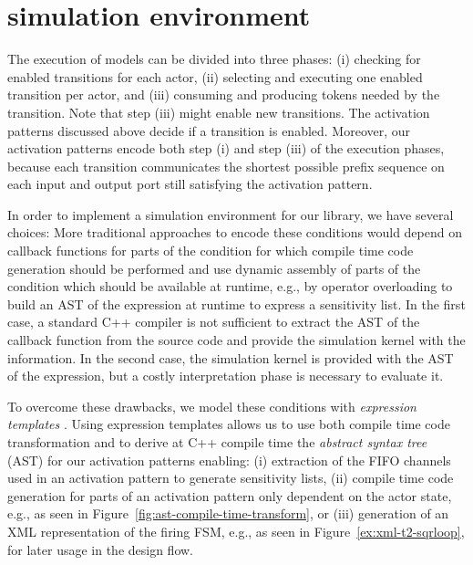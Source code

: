 \chapter{\SysteMoC{} simulation environment}\label{sec:systemoc-implementation}

The execution of \SysteMoC{} models can be divided into three phases:
(i)   checking for enabled transitions for each actor,
(ii)  selecting and executing one enabled transition per actor, and
(iii) consuming and producing tokens needed by the transition.
Note that step (iii) might enable new transitions.
The activation patterns discussed above decide if a transition is enabled.
Moreover, our activation patterns encode both step (i) and step (iii) of the execution phases, because each transition communicates the shortest possible prefix sequence on each input and output port still satisfying the activation pattern.

In order to implement a simulation environment for our \SysteMoC{} library, we have several choices:
More traditional approaches to encode these conditions would depend on callback functions for parts of the condition for which compile time code generation should be performed and use dynamic assembly of parts of the condition which should be available at runtime, e.g., by operator overloading to build an AST of the expression at runtime to express a sensitivity list.
In the first case, a standard C++ compiler is not sufficient to extract the AST of the callback function from the source code and provide the simulation kernel with the information.
In the second case, the simulation kernel is provided with the AST of the expression, but a costly interpretation phase is necessary to evaluate it.

To overcome these drawbacks, we model these conditions with \emph{expression templates} \cite{veldhuizen:1995}.
Using expression templates allows us to use both compile time code transformation and to derive at C++ compile time the \emph{abstract syntax tree} (AST) for our activation patterns enabling:
(i) extraction of the FIFO channels used in an activation pattern to generate sensitivity lists,
(ii) compile time code generation for parts of an activation pattern only dependent on the actor state, e.g., as seen in Figure~\ref{fig:ast-compile-time-transform}, or
(iii) generation of an XML representation of the firing FSM, e.g., as seen in Figure~\ref{ex:xml-t2-sqrloop}, for later usage in the design flow.

